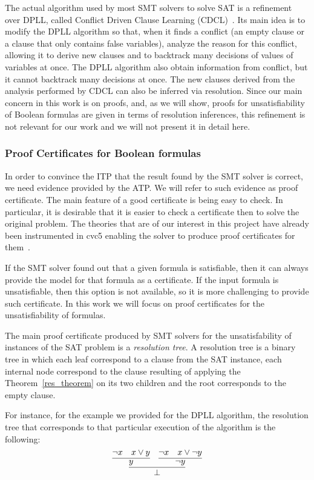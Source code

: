 The actual algorithm used by most SMT solvers to solve SAT is a refinement over DPLL, called Conflict Driven Clause Learning (CDCL)~\cite{cdcl}. Its main idea is to modify the DPLL algorithm so that, when it finds a conflict (an empty clause or a clause that only contains false variables), analyze the reason for this conflict, allowing it to derive new clauses and to backtrack many decisions of values of variables at once.
The DPLL algorithm also obtain information from conflict, but it cannot backtrack many decisions at once.
The new clauses derived from the analysis performed by CDCL can also be inferred via resolution.
Since our main concern in this work is on proofs, and, as we will show, proofs for unsatisfiability
of Boolean formulas are given in terms of resolution inferences, this refinement is not relevant
for our work and we will not present it in detail here.

\subsubsection{Proof Certificates for Boolean formulas}

In order to convince the ITP that the result found by the SMT solver is correct, we need evidence provided by the
ATP.
%
We will refer to such evidence as proof certificate.
%
The main feature of a good certificate is being easy to check.
%
In particular, it is desirable that it is easier to check a certificate then to solve the original problem.
%
The theories that are of our interest in this project have already been instrumented in cvc5 enabling the solver to produce proof certificates for them~\cite{Barbosa2022}.

If the SMT solver found out that a given formula is satisfiable, then it can always provide the model for that formula as a certificate. If the input formula is unsatisfiable, then this option is not available, so it is more challenging to provide such certificate. In this work we will focus on proof certificates for the unsatisfiability of formulas.

The main proof certificate produced by SMT solvers for the unsatisfability of instances of the SAT problem is
a \textit{resolution tree}. A resolution tree is a binary tree in which each leaf correspond to a clause from the SAT instance, each internal node correspond to the clause resulting of applying the Theorem~\ref{res_theorem} on its two children and the root corresponds to the empty clause.

For instance, for the example we provided for the DPLL algorithm, the resolution tree that corresponds to that
particular execution of the algorithm is the following:
\[
  \infer{\bot}{\infer{y}{\neg x & x \vee y} & \infer{\neg y}{\neg x & x \vee \neg y}}
\]

